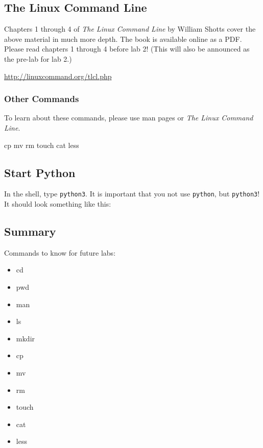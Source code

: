 \documentclass[11pt]{cselabheader}
\begin{document}
\subsection{The Linux Command Line}

Chapters 1 through 4 of \textit{The Linux Command Line} by William Shotts cover
the above material in much more depth. The book is available online as a PDF.
Please read chapters 1 through 4 before lab 2! (This will also be announced as
the pre-lab for lab 2.)
\begin{center}
  \url{http://linuxcommand.org/tlcl.php}
\end{center}

\subsubsection{Other Commands}

To learn about these commands, please use man pages or \textit{The Linux Command
Line}.

\begin{bashcode}
cp
mv
rm
touch
cat
less
\end{bashcode}

\subsection{Start Python}

In the shell, type \texttt{python3}. It is important that you not use
\texttt{python}, but \texttt{python3}! It should look something like this:


\subsection{Summary}
\label{sec:linux.res}

Commands to know for future labs:
\begin{multicols}{3}
\begin{itemize}
  \item cd
  \item pwd
  \item man
  \item ls
  \item mkdir
  \item cp
  \item mv
  \item rm
  \item touch
  \item cat
  \item less
\end{itemize}
\end{multicols}
\end{document}
